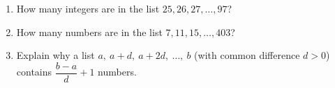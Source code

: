 \begin{enumerate}
\item[(a)] How many integers are in the list $25,26,27,\ldots,97$?
\item[(b)] How many numbers are in the list $7,11,15,\ldots,403$?
\item[(c)] Explain why a list $a,\ a+d,\ a+2d,\ \ldots,\ b$ (with common difference $d>0$) contains $\dfrac{b-a}{d}+1$ numbers.
\end{enumerate}
